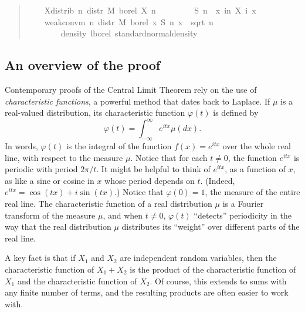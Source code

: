 \documentclass{svjour3}
\newcommand{\ph}{\varphi}
\begin{document}
\begin{quote}
\begin{isabellebody}
\ \ \ \ X{\isacharunderscore}distrib{\isacharcolon}\ {\isachardoublequoteopen}{\isasymAnd}n{\isachardot}\ distr\ M\ borel\ {\isacharparenleft}X\ n{\isacharparenright}\ {\isacharequal}\ {\isasymmu}{\isachardoublequoteclose}\isanewline
\ \ \isanewline
\ \ \ \ {\isachardoublequoteopen}S\ n\ {\isasymequiv}\ {\isasymlambda}x{\isachardot}\ {\isasymSum}i{\isacharless}n{\isachardot}\ X\ i\ x{\isachardoublequoteclose}\isanewline
\ \ \isanewline
\ \ \ \ {\isachardoublequoteopen}weak{\isacharunderscore}conv{\isacharunderscore}m\ {\isacharparenleft}{\isasymlambda}n{\isachardot}\ distr\ M\ borel\ {\isacharparenleft}{\isasymlambda}x{\isachardot}\ S\ n\ x\ {\isacharslash}\ sqrt\ {\isacharparenleft}n\ {\isacharasterisk}\ {\isasymsigma}\ \isanewline
\ \ \ \ \ \ \ \ {\isacharparenleft}density\ lborel\ standard{\isacharunderscore}normal{\isacharunderscore}density{\isacharparenright}{\isachardoublequoteclose}
\end{isabellebody}
\end{quote}

\subsection{An overview of the proof}

Contemporary proofs of the Central Limit Theorem rely on the use of \emph{characteristic functions}, a powerful method that dates back to Laplace. If $\mu$ is a real-valued distribution, its characteristic function $\ph(t)$ is defined by
\[
\ph(t) = \int_{-\infty}^{\infty} e^{itx} \mu(dx).
\]
In words, $\ph(t)$ is the integral of the function $f(x) = e^{itx}$ over the whole real line, with respect to the measure $\mu$. Notice that for each $t \neq 0$, the function $e^{itx}$ is periodic with period $2 \pi / t$. It might be helpful to think of $e^{itx}$, as a function of $x$, as like a sine or cosine in $x$ whose period depends on $t$. (Indeed, $e^{itx}= \cos (t x) + i \sin (t x)$.) Notice that $\ph(0) = 1$, the measure of the entire real line. The characteristic function of a real distribution $\mu$ is a Fourier transform of the measure $\mu$, and when $t \neq 0$, $\ph(t)$ ``detects'' periodicity in the way that the real distribution $\mu$ distributes its ``weight'' over different parts of the real line.

A key fact is that if $X_1$ and $X_2$ are independent random variables, then the characteristic function of $X_1 + X_2$ is the product of the characteristic function of $X_1$ and the characteristic function of $X_2$. Of course, this extends to sums with any finite number of terms, and the resulting products are often easier to work with. 
\end{document}

